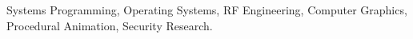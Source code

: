 
Systems Programming, Operating Systems, RF Engineering, Computer Graphics, Procedural Animation, Security Research.
